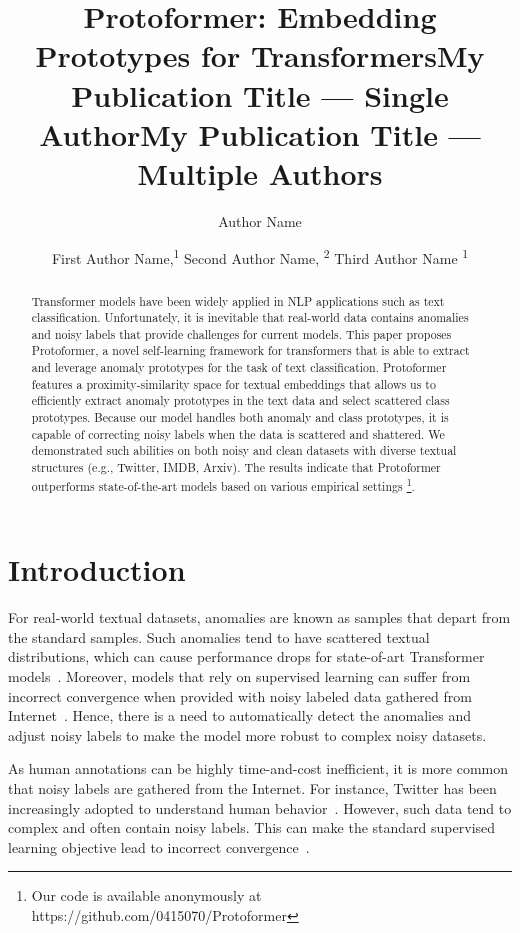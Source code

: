 \documentclass[letterpaper]{article} \usepackage{aaai22}  \usepackage{times}  \usepackage{helvet}  \usepackage{courier}  \usepackage{amsmath,amssymb}
\title{Protoformer: Embedding Prototypes for Transformers}
\title{My Publication Title --- Single Author}
\author {
    Author Name
}
\title{My Publication Title --- Multiple Authors}
\author {
First Author Name,\textsuperscript{\rm 1}
    Second Author Name, \textsuperscript{\rm 2}
    Third Author Name \textsuperscript{\rm 1}
}
\begin{document}
\maketitle

\begin{abstract}
Transformer models have been widely applied in NLP applications such as text classification.
Unfortunately, it is inevitable that real-world data contains anomalies and noisy labels that provide challenges for current models. 
This paper proposes Protoformer, a novel self-learning framework for transformers that is able to extract and leverage anomaly prototypes for the task of text classification. 
Protoformer features a proximity-similarity space for textual embeddings that allows us to efficiently extract anomaly prototypes in the text data and select scattered class prototypes. Because our model handles both anomaly and class prototypes, it is capable of correcting noisy labels when the data is scattered and shattered. We demonstrated such abilities on both noisy and clean datasets with diverse textual structures (e.g., Twitter, IMDB, Arxiv). The results indicate that Protoformer outperforms state-of-the-art models based on various empirical settings
\footnote{Our code is available anonymously at https://github.com/0415070/Protoformer}. 
\end{abstract}

\pagestyle{plain}  

\section{Introduction}
\vspace{-2mm}
For real-world textual datasets, anomalies are known as samples that depart from the standard samples. Such anomalies tend to have scattered textual distributions, which can cause performance drops for state-of-art Transformer models~\cite{vaswani2017attentionTransformersOG}.
Moreover, models that rely on supervised learning can suffer from incorrect convergence when provided with noisy labeled data gathered from Internet~\cite{wei2020combating}.
Hence, there is a need to automatically detect the anomalies and adjust noisy labels to make the model more robust to complex noisy datasets.

As human annotations can be highly time-and-cost inefficient, it is more common that noisy labels are gathered from the Internet. For instance, Twitter has been increasingly adopted to understand human behavior~\cite{fiok2021Maham}. However, such data tend to complex and often contain noisy labels. This can make the standard supervised learning objective lead to incorrect convergence~\cite{garg2020noisy}.
\end{document}

